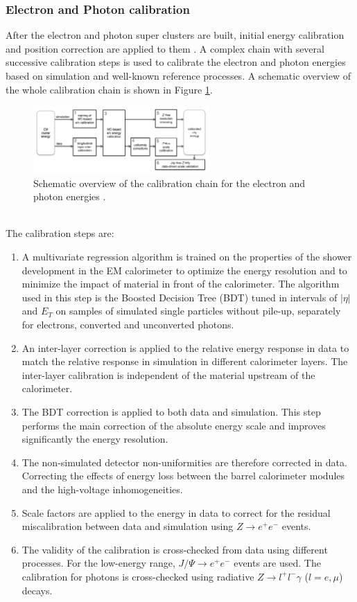 \subsubsection{Electron and Photon calibration}
\label{chap2:Objects:Egamma:Cal}
After the electron and photon super clusters are built, initial energy calibration and position correction are applied to them \cite{Egamma_Calibration}. A complex chain with several successive calibration steps is used to calibrate the electron and photon energies based on simulation and well-known reference processes. A schematic overview of the whole calibration chain is shown in Figure \ref{fig:chap2:Objects:Egamma:Cal}.
\begin{figure}[htbp]
    \centering
    \includegraphics[width=0.6\textwidth]{Ch2/Img/Calibration_Chain.png}
    \caption{Schematic overview of the calibration chain for the electron and photon energies \cite{Egamma_Calib_run1}.}
    \label{fig:chap2:Objects:Egamma:Cal}
\end{figure}
\\
The calibration steps are:
\begin{enumerate}
    \item A multivariate regression algorithm is trained on the properties of the shower development in the EM calorimeter to optimize the energy resolution and to minimize the impact of material in front of the calorimeter. The algorithm used in this step is the Boosted Decision Tree (BDT) tuned in intervals of $|\eta|$ and $E_T$ on samples of simulated single particles without pile-up, separately for electrons, converted and unconverted photons. 
    \item An inter-layer correction is applied to the relative energy response in data to match the relative response in simulation in different calorimeter layers. The inter-layer calibration is independent of the material upstream of the calorimeter.
    \item The BDT correction is applied to both data and simulation. This step performs the main correction of the absolute energy scale and improves significantly the energy resolution.
    \item The non-simulated detector non-uniformities are therefore corrected in data. Correcting the effects of energy loss between the barrel calorimeter modules and the high-voltage inhomogeneities.
    \item Scale factors are applied to the energy in data to correct for the residual miscalibration between data and simulation using $Z\rightarrow e^+e^-$ events.
    \item The validity of the calibration is cross-checked from data using different processes. For the low-energy range, $J/\Psi\rightarrow e^+e^-$ events are used. The calibration for photons is cross-checked using radiative $Z\rightarrow l^+l^-\gamma$ ($l=e,\mu$) decays.
\end{enumerate}


